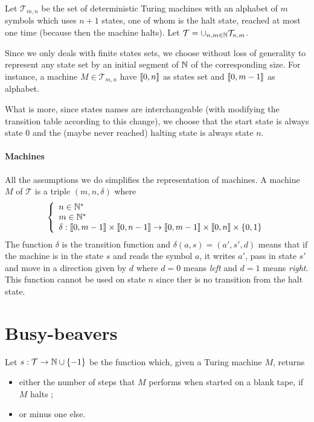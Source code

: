 \documentclass{report}
\begin{document}
 Let $\mathcal{T}_{m,n}$ be the set of deterministic Turing machines with an alphabet of $m$ symbols which uses $n + 1$ states, one of whom is the halt state, reached at most one time (because then the machine halts). Let  $\mathcal{T} = \cup_{n,m \in \mathbb{N}} \mathcal{T}_{n,m}$.

Since we only deals with finite states sets, we choose without loss of generality to represent any state set by an initial segment of $\mathbb{N}$ of the corresponding size. For instance, a machine $M \in \mathcal{T}_{m,n}$ have $\llbracket 0, n \rrbracket$ as states set and $\llbracket 0, m-1 \rrbracket$ as alphabet.

What is more, since states names are interchangeable (with modifying the transition table according to this change), we choose that the start state is always state $0$ and the (maybe never reached) halting state is always state $n$.



\paragraph{Machines}
All the assumptions we do simplifies the representation of machines. A machine $M$ of $\mathcal{T}$ is a triple $(m,n,\delta)$ where 
\[
\left \{
\begin{array}{l}
  n \in \mathbb{N}^*\\
  m \in \mathbb{N}^*\\
  \delta : \llbracket 0, m-1 \rrbracket \times \llbracket 0, n-1 \rrbracket \to \llbracket 0, m-1 \rrbracket \times \llbracket 0, n \rrbracket \times \{0,1\}
\end{array}
\right .
\]
The function $\delta$ is the transition function and $\delta(a, s) = (a', s', d)$ means that if the machine is in the state $s$ and reads the symbol $a$, it writes $a'$, pass in state $s'$ and move in a direction given by $d$ where $d = 0$ means \emph{left} and $d = 1$ means \emph{right}. This function cannot be used on state $n$ since ther is no transition from the halt state.


\section{Busy-beavers}
\label{sec:bb}

Let $s : \mathcal{T} \to \mathbb{N} \cup \{-1\}$ be the function which, given a Turing machine $M$, returns
\begin{itemize}
\item either the number of steps that $M$ performs when started on a blank tape, if $M$ halts ;
\item or minus one else.
\end{itemize}
\end{document}
